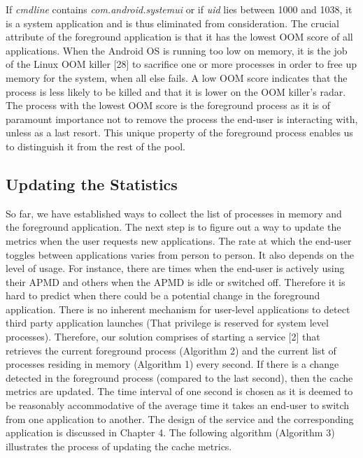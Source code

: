 \documentclass[12pt]{uthesis-v12}  %
\begin{document}
			If {\em cmdline} contains {\em com.android.systemui} or if {\em uid} lies between 1000 and 1038, it is a system application and is thus eliminated from consideration. The crucial attribute of the foreground application is that it has the lowest OOM score of all applications. When the Android OS is running too low on memory, it is the job of the Linux OOM killer [28] to sacrifice one or more processes in order to free up memory for the system, when all else fails. A low OOM score indicates that the process is less likely to be killed and that it is lower on the OOM killer's radar. The process with the lowest OOM score is the foreground process as it is of paramount importance not to remove the process the end-user is interacting with, unless as a last resort. This unique property of the foreground process enables us to distinguish it from the rest of the pool. 
			
		\subsection{Updating the Statistics}
			 So far, we have established ways to collect the list of processes in memory and the foreground application. The next step is to figure out a way to update the metrics when the user requests new applications. The rate at which the end-user toggles between applications varies from person to person. It also depends on the level of usage. For instance, there are times when the end-user is actively using their APMD and others when the APMD is idle or switched off. Therefore it is hard to predict when there could be a potential change in the foreground application. There is no inherent mechanism for user-level applications to detect third party application launches (That privilege is reserved for system level processes). Therefore, our solution comprises of starting a service [2] that retrieves the current foreground process (Algorithm 2) and the current list of processes residing in memory (Algorithm 1) every second. If there is a change detected in the foreground process (compared to the last second), then the cache metrics are updated. The time interval of one second is chosen as it is deemed to be reasonably accommodative of the average time it takes an end-user to switch from one application to another. The design of the service and the corresponding application is discussed in Chapter 4. The following algorithm (Algorithm 3) illustrates the process of updating the cache metrics.\\     
			 
\end{document}
